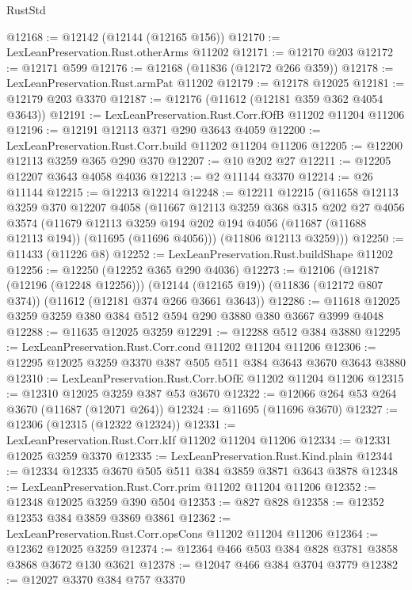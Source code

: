 \begin{lexlean}{RustStd}
\begin{coremodule}
@12168 := @12142 (@12144 (@12165 @156))
@12170 := LexLeanPreservation.Rust.otherArms @11202
@12171 := @12170 @203
@12172 := @12171 @599
@12176 := @12168 (@11836 (@12172 @266 @359))
@12178 := LexLeanPreservation.Rust.armPat @11202
@12179 := @12178 @12025
@12181 := @12179 @203 @3370
@12187 := @12176 (@11612 (@12181 @359 @362 @4054 @3643))
@12191 := LexLeanPreservation.Rust.Corr.fOfB @11202 @11204 @11206
@12196 := @12191 @12113 @371 @290 @3643 @4059
@12200 := LexLeanPreservation.Rust.Corr.build @11202 @11204 @11206
@12205 := @12200 @12113 @3259 @365 @290 @370
@12207 := @10 @202 @27
@12211 := @12205 @12207 @3643 @4058 @4036
@12213 := @2 @11144 @3370
@12214 := @26 @11144
@12215 := @12213 @12214
@12248 := @12211
    @12215
    (@11658
      @12113
      @3259
      @370
      @12207
      @4058
      (@11667
        @12113
        @3259
        @368
        @315
        @202
        @27
        @4056
        @3574
        (@11679
          @12113
          @3259
          @194
          @202
          @194
          @4056
          (@11687 (@11688 @12113 @194))
          (@11695 (@11696 @4056)))
        (@11806 @12113 @3259)))
@12250 := @11433 (@11226 @8)
@12252 := LexLeanPreservation.Rust.buildShape @11202
@12256 := @12250 (@12252 @365 @290 @4036)
@12273 := @12106
    (@12187 (@12196 (@12248 @12256)))
    (@12144 (@12165 @19))
    (@11836 (@12172 @807 @374))
    (@11612 (@12181 @374 @266 @3661 @3643))
@12286 := @11618 @12025 @3259 @3259 @380 @384 @512 @594 @290 @3880 @380 @3667 @3999 @4048
@12288 := @11635 @12025 @3259
@12291 := @12288 @512 @384 @3880
@12295 := LexLeanPreservation.Rust.Corr.cond @11202 @11204 @11206
@12306 := @12295 @12025 @3259 @3370 @387 @505 @511 @384 @3643 @3670 @3643 @3880
@12310 := LexLeanPreservation.Rust.Corr.bOfE @11202 @11204 @11206
@12315 := @12310 @12025 @3259 @387 @53 @3670
@12322 := @12066 @264 @53 @264 @3670 (@11687 (@12071 @264))
@12324 := @11695 (@11696 @3670)
@12327 := @12306 (@12315 (@12322 @12324))
@12331 := LexLeanPreservation.Rust.Corr.kIf @11202 @11204 @11206
@12334 := @12331 @12025 @3259 @3370
@12335 := LexLeanPreservation.Rust.Kind.plain
@12344 := @12334 @12335 @3670 @505 @511 @384 @3859 @3871 @3643 @3878
@12348 := LexLeanPreservation.Rust.Corr.prim @11202 @11204 @11206
@12352 := @12348 @12025 @3259 @390 @504
@12353 := @827 @828
@12358 := @12352 @12353 @384 @3859 @3869 @3861
@12362 := LexLeanPreservation.Rust.Corr.opsCons @11202 @11204 @11206
@12364 := @12362 @12025 @3259
@12374 := @12364 @466 @503 @384 @828 @3781 @3858 @3868 @3672 @130 @3621
@12378 := @12047 @466 @384 @3704 @3779
@12382 := @12027 @3370 @384 @757 @3370

\end{coremodule}
\end{lexlean}
